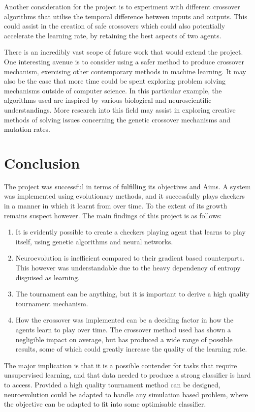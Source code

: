 \documentclass[12pt,a4paper]{article}
\begin{document}
        Another consideration for the project is to experiment with different crossover algorithms that utilise the temporal difference between inputs and outputs. This could assist in the creation of safe crossovers which could also potentially accelerate the learning rate, by retaining the best aspects of two agents.
        
        There is an incredibly vast scope of future work that would extend the project. One interesting avenue is to consider using a safer method to produce crossover mechanism, exercising other contemporary methods in machine learning. It may also be the case that more time could be spent exploring problem solving mechanisms  outside of computer science. In this particular example, the algorithms used are inspired by various biological and neuroscientific understandings. More research into this field may assist in exploring creative methods of solving issues concerning the genetic crossover mechanisms and mutation rates.
    


\section{Conclusion}

    The project was successful in terms of fulfilling its objectives and Aims. A system was implemented using evolutionary methods, and it successfully plays checkers in a manner in which it learnt from over time. To the extent of its growth remains suspect however. The main findings of this project is as follows:

    \begin{enumerate}
    \item It is evidently possible to create a checkers playing agent that learns to play itself, using genetic algorithms and neural networks.
    \item  Neuroevolution is inefficient compared to their gradient based counterparts. This however was understandable due to the heavy dependency of entropy disguised as learning.
    \item  The tournament can be anything, but it is important to derive a high quality tournament mechanism.
    \item How the crossover was implemented can be a deciding factor in how the agents learn to play over time. The crossover method used has shown a negligible impact on average, but has produced a wide range of possible results, some of which could greatly increase the quality of the learning rate.
    \end{enumerate}

    The major implication is that it is a possible contender for tasks that require unsupervised learning, and that data needed to produce a strong classifier is hard to access. Provided a high quality tournament method can be designed, neuroevolution could be adapted to handle any simulation based problem, where the objective can be adapted to fit into some optimisable classifier.

\footnotesize{}
% 
\end{document}
